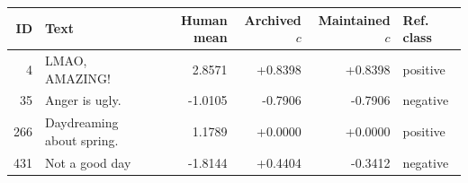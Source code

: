 \begin{tabular}{rlrrrl}
\toprule
ID & Text & Human mean & Archived $c$ & Maintained $c$ & Ref. class\\
\midrule
4 & LMAO, AMAZING! & 2.8571 & +0.8398 & +0.8398 & positive \\
35 & Anger is ugly. & -1.0105 & -0.7906 & -0.7906 & negative \\
266 & Daydreaming about spring. & 1.1789 & +0.0000 & +0.0000 & positive \\
431 & Not a good day & -1.8144 & +0.4404 & -0.3412 & negative \\
\bottomrule
\end{tabular}
